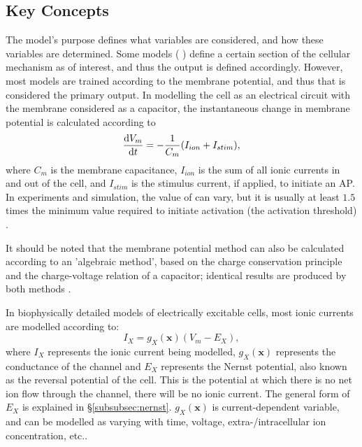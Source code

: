 \documentclass[../thesis-main.tex]{subfiles}
\begin{document}
 \subsection{Key Concepts}
 \label{subsec:model-concepts}
 The model's purpose defines what variables are considered, and how these variables are determined. Some models (\eg{} \citet{Restrepo2008}) define a certain section of the cellular mechanism as of interest, and thus the output is defined accordingly. However, most models are trained according to the membrane potential, and thus that is considered the primary output. In modelling the cell as an electrical circuit with the membrane considered as a capacitor, the instantaneous change in membrane potential is calculated according to
 \begin{equation}
  \frac{\textnormal{d}V_m}{\textnormal{d}t} = -\frac{1}{C_m}(I_{ion}+I_{stim}),
 \end{equation}
 where $C_m$ is the membrane capacitance, $I_{ion}$ is the sum of all ionic currents in and out of the cell, and $I_{stim}$ is the stimulus current, if applied, to initiate an AP. In experiments and simulation, the value of \istim{} can vary, but it is usually at least $1.5$ times the minimum value required to initiate activation (the activation threshold) \citep{Sutton2000, Riccio1999, Ferrero2003}.
 
 It should be noted that the membrane potential method can also be calculated according to an 'algebraic method', based on the charge conservation principle and the charge-voltage relation of a capacitor; identical results are produced by both methods \citep{Hund2001, Rudy2006}.
 
 In biophysically detailed models of electrically excitable cells, most ionic currents are modelled according to:
 \begin{equation}
  I_X = g_X(\mathbf{x})(V_m-E_X),
 \end{equation}
 where $I_X$ represents the ionic current being modelled, $g_X(\mathbf{x})$ represents the conductance of the channel and $E_X$ represents the Nernst potential, also known as the reversal potential of the cell. This is the potential at which there is no net ion flow through the channel, \idest{} there will be no ionic current. The general form of $E_X$ is explained in \S\ref{subsubsec:nernst}. $g_X(\mathbf{x})$ is current-dependent variable, and can be modelled as varying with time, voltage, extra-/intracellular ion concentration, etc..
 
\end{document}

